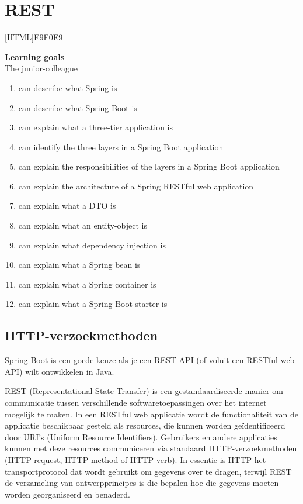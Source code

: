 \chapter{REST}

[HTML]{E9F0E9}{\parbox{\textwidth}{%
\noindent \textbf{Learning goals}\\
The junior-colleague
\begin{enumerate}[nolistsep]
\item can describe what Spring is
\item can describe what Spring Boot is
\item can explain what a three-tier application is
\item can identify the three layers in a Spring Boot application
\item can explain the responsibilities of the layers in a Spring Boot application
\item can explain the architecture of a Spring RESTful web application
\item can explain what a DTO is
\item can explain what an entity-object is
\item can explain what dependency injection is
\item can explain what a Spring bean is
\item can explain what a Spring container is
\item can explain what a Spring Boot starter is
\end{enumerate}}}

\section{HTTP-verzoekmethoden}

Spring Boot is een goede keuze als je een REST API (of voluit een RESTful web API) wilt ontwikkelen in Java.

REST (Representational State Transfer) is een gestandaardiseerde manier om communicatie tussen verschillende softwaretoepassingen over het internet mogelijk te maken. 
In een RESTful web applicatie wordt de functionaliteit van de applicatie beschikbaar gesteld als resources, die kunnen worden geïdentificeerd door URI's (Uniform Resource Identifiers).  Gebruikers en andere applicaties kunnen met deze resources communiceren via standaard HTTP-verzoekmethoden (HTTP-request, HTTP-method of HTTP-verb). In essentie is HTTP het transportprotocol dat wordt gebruikt om gegevens over te dragen,  terwijl REST de verzameling van ontwerpprincipes is die bepalen hoe die gegevens moeten worden georganiseerd en benaderd.

